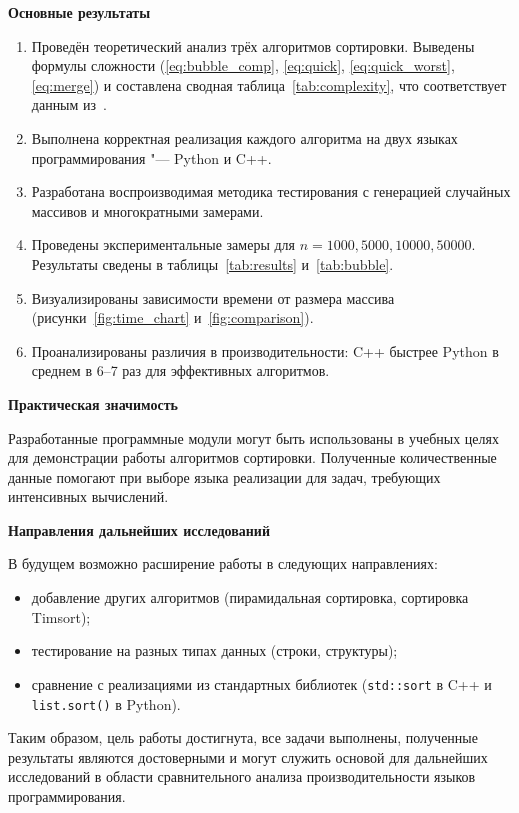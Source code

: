 
\textbf{Основные результаты}

\begin{enumerate}
    \item Проведён теоретический анализ трёх алгоритмов сортировки. Выведены формулы сложности (\ref{eq:bubble_comp}, \ref{eq:quick}, \ref{eq:quick_worst}, \ref{eq:merge}) и составлена сводная таблица~\ref{tab:complexity}, что соответствует данным из~\cite{knuth1998}.
    \item Выполнена корректная реализация каждого алгоритма на двух языках программирования "--- Python и C++.
    \item Разработана воспроизводимая методика тестирования с генерацией случайных массивов и многократными замерами.
    \item Проведены экспериментальные замеры для $n = 1000, 5000, 10000, 50000$. Результаты сведены в таблицы~\ref{tab:results} и~\ref{tab:bubble}.
    \item Визуализированы зависимости времени от размера массива (рисунки~\ref{fig:time_chart} и~\ref{fig:comparison}).
    \item Проанализированы различия в производительности: C++ быстрее Python в среднем в 6--7 раз для эффективных алгоритмов.
\end{enumerate}

\textbf{Практическая значимость}

Разработанные программные модули могут быть использованы в учебных целях для демонстрации работы алгоритмов сортировки. Полученные количественные данные помогают при выборе языка реализации для задач, требующих интенсивных вычислений.

\textbf{Направления дальнейших исследований}

В будущем возможно расширение работы в следующих направлениях:
\begin{itemize}
    \item добавление других алгоритмов (пирамидальная сортировка, сортировка Timsort);
    \item тестирование на разных типах данных (строки, структуры);
    \item сравнение с реализациями из стандартных библиотек (\texttt{std::sort} в C++ и \texttt{list.sort()} в Python).
\end{itemize}

Таким образом, цель работы достигнута, все задачи выполнены, полученные результаты являются достоверными и могут служить основой для дальнейших исследований в области сравнительного анализа производительности языков программирования.
